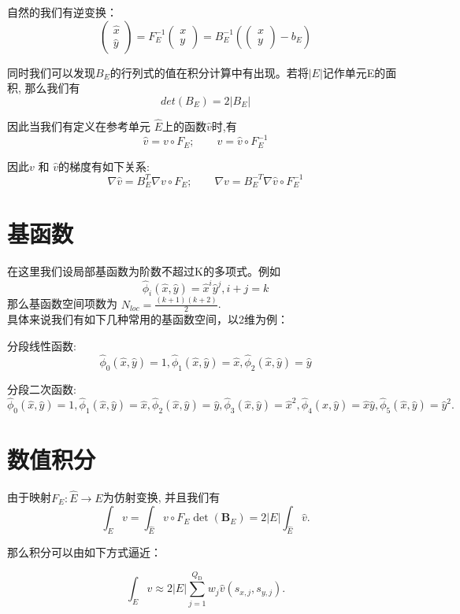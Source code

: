 自然的我们有逆变换： 
$$
\begin{pmatrix}
    \hat{x}\\ 
    \hat{y}
\end{pmatrix} = F_E^{-1}\begin{pmatrix}
x\\y
\end{pmatrix}=B_E^{-1}\left(\begin{pmatrix}
    x\\ 
    y
\end{pmatrix}-b_E\right)
$$ 

同时我们可以发现$B_E$的行列式的值在积分计算中有出现。若将$|E|$记作单元E的面积, 那么我们有
$$det(B_E)=2|B_E|$$

因此当我们有定义在参考单元 $\hat{E}$上的函数$\hat{v}$时,有 
$$\hat{v}=v\circ F_E; \qquad v = \hat{v}\circ F_E^{-1}$$

因此$v$ 和 $\hat{v}$的梯度有如下关系:
$$\nabla \hat{v} = B_E^T \nabla v\circ F_E;\qquad \nabla v = B_E^{-T}\nabla \hat{v}\circ F_E^{-1}$$

\section{基函数}
在这里我们设局部基函数为阶数不超过K的多项式。例如
$$\hat{\phi}_i(\hat{x}, \hat{y})=\hat{x}^i\hat{y}^j,i+j=k$$
那么基函数空间项数为 $N_{loc}=\frac{(k+1)(k+2)}{2}$.
\\
具体来说我们有如下几种常用的基函数空间，以2维为例：

分段线性函数:
$$\hat{\phi}_{0}(\hat{x}, \hat{y})=1,  \hat{\phi}_{1}(\hat{x}, \hat{y})=\hat{x}, \hat{\phi}_{2}(\hat{x}, \hat{y})=\hat{y}$$

分段二次函数:
$$\hat{\phi}_{0}(\hat{x}, \hat{y})=1,  \hat{\phi}_{1}(\hat{x}, \hat{y})=\hat{x}, \hat{\phi}_{2}(\hat{x}, \hat{y})=\hat{y},
\hat{\phi}_{3}(\hat{x}, \hat{y})=\hat{x}^{2}, \hat{\phi}_{4}(\hat{x}, \hat{y})=\hat{x} \hat{y}, \hat{\phi}_{5}(\hat{x}, \hat{y})=\hat{y}^{2} .
$$

\section{数值积分}
由于映射$F_E : \hat{E} \rightarrow E $为仿射变换, 并且我们有
$$\int_{E} v=\int_{\hat{E}} v \circ F_{E} \operatorname{det}\left(\boldsymbol{B}_{E}\right)=2|E| \int_{\hat{E}} \hat{v} .$$

那么积分可以由如下方式逼近：

$$\int_{E} v \approx 2|E| \sum_{j=1}^{Q_{\mathrm{D}}} w_{j} \hat{v}\left(s_{x, j}, s_{y, j}\right) .$$


